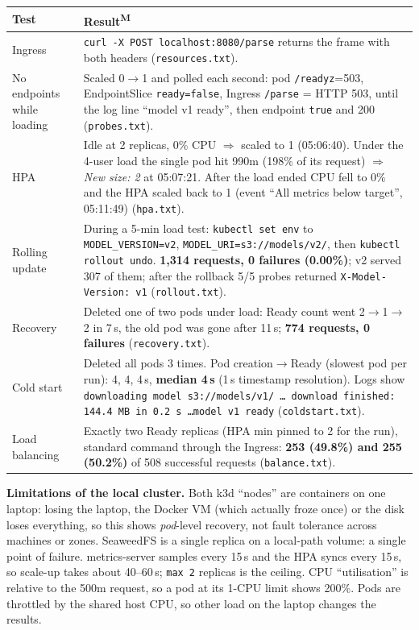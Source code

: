 \documentclass[10pt,a4paper]{article}
\newcommand{\code}[1]{\texttt{\small #1}}
\newcommand{\meas}{\textsuperscript{\textbf{M}}}
\begin{document}
\begin{center}\small
\begin{tabularx}{\textwidth}{>{\raggedright}p{2.7cm}X}
\toprule
Test & Result\meas{}\\
\midrule
Ingress & \code{curl -X POST localhost:8080/parse} returns the frame with both headers (\code{resources.txt}).\\
No endpoints while loading & Scaled 0$\to$1 and polled each second: pod \code{/readyz}=503, EndpointSlice
\code{ready=false}, Ingress \code{/parse} = HTTP 503, until the log line ``model v1 ready'', then endpoint
\code{true} and 200 (\code{probes.txt}).\\
HPA & Idle at 2 replicas, 0\% CPU $\Rightarrow$ scaled to 1 (05:06:40). Under the 4-user load the single pod hit
990m (198\% of its request) $\Rightarrow$ \emph{New size: 2} at 05:07:21. After the load ended CPU fell to 0\% and
the HPA scaled back to 1 (event ``All metrics below target'', 05:11:49) (\code{hpa.txt}).\\
Rolling update & During a 5-min load test: \code{kubectl set env} to \code{MODEL\_VERSION=v2},
\code{MODEL\_URI=s3://models/v2/}, then \code{kubectl rollout undo}. \textbf{1,314 requests, 0 failures (0.00\%)};
v2 served 307 of them; after the rollback 5/5 probes returned \code{X-Model-Version: v1} (\code{rollout.txt}).\\
Recovery & Deleted one of two pods under load: Ready count went 2$\to$1$\to$2 in 7\,s, the old pod was gone after
11\,s; \textbf{774 requests, 0 failures} (\code{recovery.txt}).\\
Cold start & Deleted all pods 3 times. Pod creation$\to$Ready (slowest pod per run): 4, 4, 4\,s,
\textbf{median 4\,s} (1\,s timestamp resolution). Logs show \code{downloading model s3://models/v1/ \ldots
download finished: 144.4 MB in 0.2\,s \ldots model v1 ready} (\code{coldstart.txt}).\\
Load balancing & Exactly two Ready replicas (HPA min pinned to 2 for the run), standard command through the
Ingress: \textbf{253 (49.8\%) and 255 (50.2\%)} of 508 successful requests (\code{balance.txt}).\\
\bottomrule
\end{tabularx}
\end{center}
\textbf{Limitations of the local cluster.} Both k3d ``nodes'' are containers on one laptop: losing the laptop, the
Docker VM (which actually froze once) or the disk loses everything, so this shows \emph{pod}-level recovery, not
fault tolerance across machines or zones. SeaweedFS is a single replica on a local-path volume: a single point of
failure. metrics-server samples every 15\,s and the HPA syncs every 15\,s, so scale-up takes about 40--60\,s;
\code{max 2} replicas is the ceiling. CPU ``utilisation'' is relative to the 500m request, so a pod at its 1-CPU limit shows
200\%. Pods are throttled by the shared host CPU, so other load on the laptop changes the results.
\end{document}
